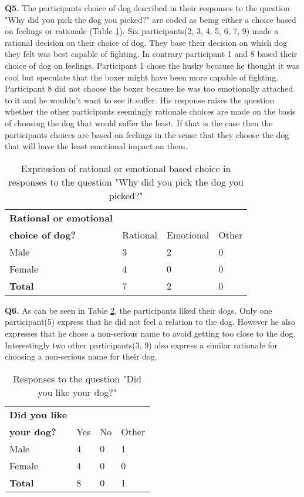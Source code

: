 \textbf{Q5.} The participants choice of dog described in their responses to the question "Why did you pick the dog you picked?" are coded as being either a choice based on feelings or rationale (Table \ref{tab:rati}). Six participants(2, 3, 4, 5, 6, 7, 9) made a rational decision on their choice of dog. They base their decision on which dog they felt was best capable of fighting. In contrary participant 1 and 8 based their choice of dog on feelings. Participant 1 chose the husky because he thought it was cool but speculate that the boxer might have been more capable of fighting. Participant 8 did not choose the boxer because he was too emotionally attached to it and he wouldn't want to see it suffer. His response raises the question whether the other participants seemingly rationale choices are made on the basis of choosing the dog that would suffer the least. If that is the case then the participants choices are based on feelings in the sense that they choose the dog that will have the least emotional impact on them.

\begin{table}[h]
\centering
\begin{tabular}{l l l l}
\hline
\textbf{Rational or emotional}\\
\textbf{choice of dog?} & Rational & Emotional & Other \\
\hline
Male & 3 & 2 & 0 \\
Female & 4 & 0 & 0 \\
\textbf{Total} & 7 & 2 & 0 \\
\hline
\end{tabular}
\caption{\label{tab:rati}Expression of rational or emotional based choice in responses to the question "Why did you pick the dog you picked?"}
\end{table}


\textbf{Q6.} As can be seen in Table \ref{tab:like}, the participants liked their dogs. Only one participant(5) express that he did not feel a relation to the dog. However he also expresses that he chose a non-serious name to avoid getting too close to the dog. Interestingly two other participants(3, 9) also express a similar rationale for choosing a non-serious name for their dog. 

\begin{table}[h]
\centering
\begin{tabular}{l l l l}
\hline
\textbf{Did you like}\\
\textbf{your dog?} & Yes & No & Other \\
\hline
Male & 4 & 0 & 1 \\
Female & 4 & 0 & 0 \\
\textbf{Total} & 8 & 0 & 1 \\
\hline
\end{tabular}
\caption{\label{tab:like}Responses to the question "Did you like your dog?"}
\end{table}


